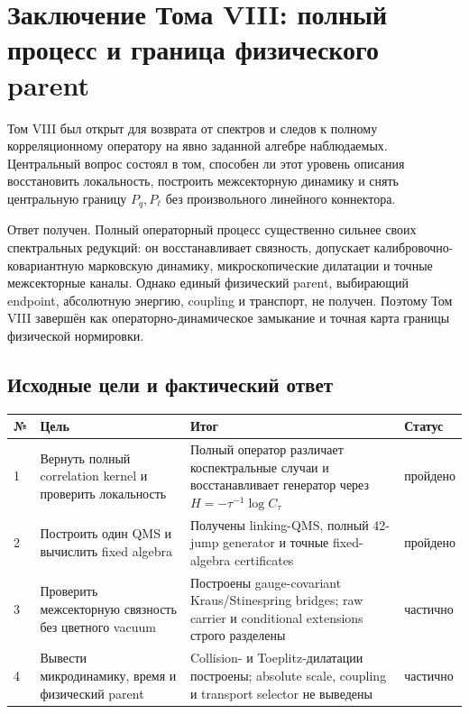 \chapter{Заключение Тома VIII: полный процесс и граница физического parent}
\label{ch:v8-final-conclusion}

Том VIII был открыт для возврата от спектров и следов к полному
корреляционному оператору на явно заданной алгебре наблюдаемых. Центральный
вопрос состоял в том, способен ли этот уровень описания восстановить
локальность, построить межсекторную динамику и снять центральную границу
$P_q,P_\ell$ без произвольного линейного коннектора.

Ответ получен. Полный операторный процесс существенно сильнее своих
спектральных редукций: он восстанавливает связность, допускает
калибровочно-ковариантную марковскую динамику, микроскопические дилатации и
точные межсекторные каналы. Однако единый физический parent, выбирающий
endpoint, абсолютную энергию, coupling и транспорт, не получен. Поэтому
Том VIII завершён как операторно-динамическое замыкание и точная карта
границы физической нормировки.

\section{Исходные цели и фактический ответ}

\begin{center}
\small
\setlength{\tabcolsep}{2pt}
\begin{longtable}{p{}p{}p{}p{}}
\toprule
№ & Цель & Итог & Статус \\
\midrule
\endhead
1 & Вернуть полный correlation kernel и проверить локальность & Полный
оператор различает коспектральные случаи и восстанавливает генератор через
$H=-\tau^{-1}\log C_\tau$ & пройдено \\
2 & Построить один QMS и вычислить fixed algebra & Получены linking-QMS,
полный 42-jump generator и точные fixed-algebra certificates & пройдено \\
3 & Проверить межсекторную связность без цветного vacuum & Построены
gauge-covariant Kraus/Stinespring bridges; raw carrier и conditional
extensions строго разделены & частично \\
4 & Вывести микродинамику, время и физический parent & Collision- и
Toeplitz-дилатации построены; absolute scale, coupling и transport selector
не выведены & частично \\
\bottomrule
\end{longtable}
\end{center}


